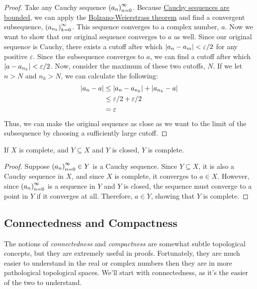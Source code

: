 \begin{proof}
Take any Cauchy sequence $\seq{a}$. Because \hyperlink{Cauchy Sequences are Bounded}{Cauchy sequences are bounded}, we can apply the \hyperlink{Bolzano-Weierstrass Theorem}{Bolzano-Weierstrass theorem} and find a convergent subsequence, $\seq{a}[n_k][k]$. This sequence converges to a complex number, $a$. Now we want to show that our original sequence converges to $a$ as well.
Since our original sequence is Cauchy, there exists a cutoff after which $\left\lvert a_n-a_m \right\rvert < \varepsilon/2$ for any positive $\varepsilon$. Since the subsequence converges to $a$, we can find a cutoff after which $\left\lvert a-a_{n_k} \right\rvert < \varepsilon/2$. Now, consider the maximum of these two cutoffs, $N$. If we let $n> N$ and $n_k>N$, we can calculate the following: 
\begin{align*}
\left\lvert a_n - a \right\rvert &\leq \left\lvert a_n-a_{n_k} \right\rvert + \left\lvert a_{n_k}-a \right\rvert\\ &\leq \varepsilon/2 +\varepsilon/2\\ &= \varepsilon
\end{align*}
Thus, we can make the original sequence as close as we want to the limit of the subsequence by choosing a sufficiently large cutoff.
\end{proof}
\begin{theorem}
If $X$ is complete, and $Y \subseteq X$ and $Y$ is closed, $Y$ is complete.
\end{theorem}
\begin{proof}
Suppose $\seq{a} \in Y$ is a Cauchy sequence. Since $Y \subseteq X$, it is also a Cauchy sequence in $X$, and since $X$ is complete, it converges to $a \in X$. However, since $\seq{a}$ is a sequence in $Y$ and $Y$ is closed, the sequence must converge to a point in $Y$ if it converges at all. Therefore, $a \in Y$, showing that $Y$ is complete.
\end{proof}
\subsection{Connectedness and Compactness}
The notions of \emph{connectedness} and \emph{compactness} are somewhat subtle topological concepts, but they are extremely useful in proofs. Fortunately, they are much easier to understand in the real or complex numbers then they are in more pathological topological spaces. We'll start with connectedness, as it's the easier of the two to understand.
